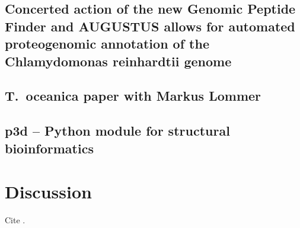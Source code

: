 \documentclass[11pt,a4paper,twoside]{report}
\begin{document}
\section{Concerted action of the new Genomic Peptide Finder and AUGUSTUS allows for automated proteogenomic annotation of the Chlamydomonas reinhardtii genome}
% 


\section{T.~oceanica paper with Markus Lommer}

\section{p3d -- Python module for structural bioinformatics}

\chapter{Discussion}

Cite \cite{Specht2011}.



    
\end{document}
